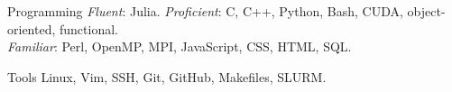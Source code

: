 \begin{skills}
    \item{Programming}
        \textit{Fluent}: Julia.
        \textit{Proficient}:
        C, C++, Python, Bash, CUDA, object-oriented, functional.
    \\\hphantom{\bfseries Programming:}
        \textit{Familiar}: Perl, OpenMP, MPI, JavaScript, CSS, HTML, SQL.
    \item{Tools}
        Linux, Vim, SSH, Git, GitHub, Makefiles, SLURM.
\end{skills}
